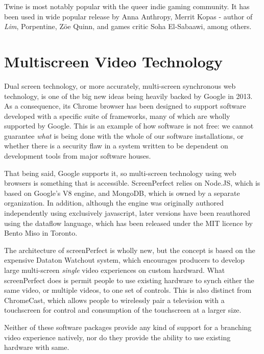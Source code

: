 Twine is most notably popular with the queer indie gaming community. It has been used in wide popular release by Anna Anthropy, Merrit Kopas - author of \textit{Lim}, Porpentine, Zöe Quinn, and games critic Soha El-Sabaawi, among others. 



\section{Multiscreen Video Technology}
Dual screen technology, or more accurately, multi-screen synchronous web technology, is one of the big new ideas being heavily backed by Google in 2013. As a consequence, its Chrome browser has been designed to support software developed with a specific suite of frameworks, many of which are wholly supported by Google. This is an example of how software is not free: we cannot guarantee \textit{what} is being done with the whole of our software installations, or whether there is a security flaw in a system written to be dependent on development tools from major software houses. 

That being said, Google supports it, so multi-screen technology using web browsers is something that is accessible. ScreenPerfect relies on Node.JS, which is based on Google's V8 engine, and MongoDB, which is owned by a separate organization. In addition, although the engine was originally authored independently using exclusively javascript, later versions have been reauthored using the \cite{daimio} dataflow language, which has been released under the MIT licence by Bento Miso in Toronto.

The architecture of screenPerfect is wholly new, but the concept is based on the expensive Dataton Watchout system, which encourages producers to develop large multi-screen \textit{single} video experiences on custom hardward. What screenPerfect does is permit people to use existing hardware to synch either the same video, or multiple videos, to one set of controls. This is also distinct from ChromeCast, which allows people to wirelessly pair a television with a touchscreen for control and consumption of the touchscreen at a larger size. 

Neither of these software packages provide any kind of support for a branching video experience natively, nor do they provide the ability to use existing hardware with same.



